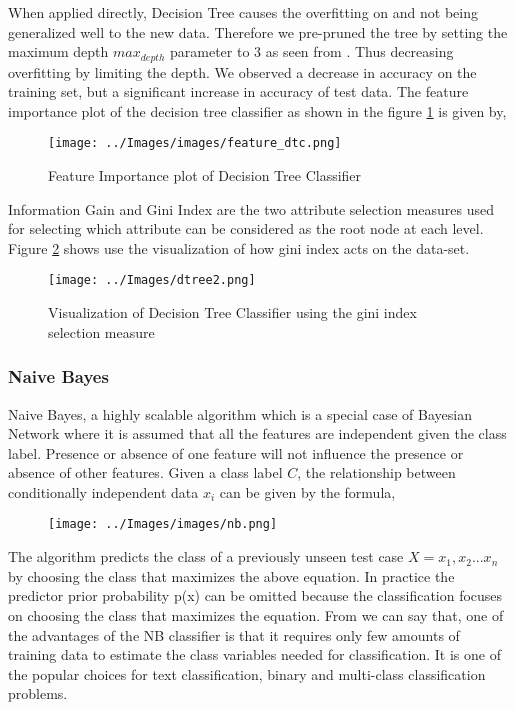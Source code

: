 \documentclass[conference]{IEEEtran}
\begin{document}
When applied directly, Decision Tree causes the overfitting on \cite{monoclonal1} and not being generalized well to the new data. Therefore we pre-pruned the tree by setting the maximum depth $max_{depth}$ parameter to 3 as seen from \cite{dt}. Thus decreasing overfitting by limiting the depth. We observed a decrease in accuracy on the training set, but a significant increase in accuracy of test data. The feature importance plot of the decision tree classifier as shown in the figure \ref{feature_dtc} is given by,

\begin{figure}[h!]
	\centering
	\texttt{[image: ../Images/images/feature\_dtc.png]}
	\caption{Feature Importance plot of Decision Tree Classifier}	
	\label{feature_dtc}
\end{figure}
Information Gain and Gini Index are the two attribute selection measures used for selecting which attribute can be considered as the root node at each level. Figure \ref{gini} shows use the visualization of how gini index acts on the data-set.

\begin{figure*}[h!]
	\centering
	\texttt{[image: ../Images/dtree2.png]}
	\caption{Visualization of Decision Tree Classifier using the gini index selection measure}	
	\label{gini}
\end{figure*}

\subsubsection*{Naive Bayes}
Naive Bayes, a highly scalable algorithm which is a special case of Bayesian Network where it is assumed that all the features are independent given the class label. Presence or absence of one feature will not influence the presence or absence of other features. Given a class label $C$, the relationship between conditionally independent data $x_i$ can be given by the formula,
\begin{figure}[H]
	\centering
	\texttt{[image: ../Images/images/nb.png]}
	\label{fig:nb}
\end{figure}
\par
The algorithm predicts the class of a previously unseen test case $X={x_1, x_2... x_n}$ by choosing the class that maximizes the above equation. In practice the predictor prior probability p(x) can be omitted because the classification focuses on choosing the class that maximizes the equation. From \cite{nb} we can say that, one of the advantages of the NB classifier is that it requires only few amounts of training data to estimate the class variables needed for classification. It is one of the popular choices for text classification, binary and multi-class classification problems.
\end{document}
